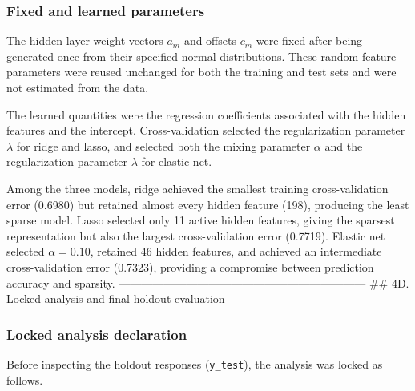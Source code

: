 \documentclass[
  11pt,
]{article}
\begin{document}
\subsubsection{Fixed and learned
parameters}\label{fixed-and-learned-parameters}

The hidden-layer weight vectors \(a_m\) and offsets \(c_m\) were fixed
after being generated once from their specified normal distributions.
These random feature parameters were reused unchanged for both the
training and test sets and were not estimated from the data.

The learned quantities were the regression coefficients associated with
the hidden features and the intercept. Cross-validation selected the
regularization parameter \(\lambda\) for ridge and lasso, and selected
both the mixing parameter \(\alpha\) and the regularization parameter
\(\lambda\) for elastic net.

Among the three models, ridge achieved the smallest training
cross-validation error (0.6980) but retained almost every hidden feature
(198), producing the least sparse model. Lasso selected only 11 active
hidden features, giving the sparsest representation but also the largest
cross-validation error (0.7719). Elastic net selected \(\alpha=0.10\),
retained 46 hidden features, and achieved an intermediate
cross-validation error (0.7323), providing a compromise between
prediction accuracy and sparsity.
------------------------------------------------------------------ \#\#
4D. Locked analysis and final holdout evaluation

\subsubsection{Locked analysis
declaration}\label{locked-analysis-declaration}

Before inspecting the holdout responses (\texttt{y\_test}), the analysis
was locked as follows.
\end{document}
